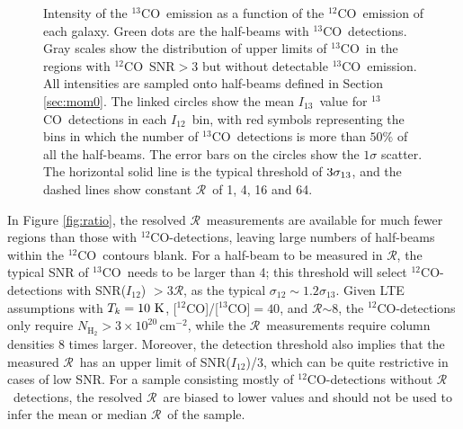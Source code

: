 \documentclass{emulateapj}
\def\ttco{\mbox{$^{13}$CO}}
\def\twco{\mbox{$^{12}$CO}}
\def\rtt{$\mathcal{R}$}
\def\un{\rm \ }
\def\itw{$I_{12}$}
\def\itt{$I_{13}$}
\begin{document}
 \begin{figure*}
\vspace{-1cm}
\caption{
Intensity of the \ttco \  emission as a function of the
  \twco \ emission of each galaxy. 
Green dots are the half-beams with \ttco \ detections.   
Gray scales show the distribution of upper limits of \ttco \  
in the regions with \twco \ SNR$ > 3$ but without detectable \ttco \  emission. 
All intensities are sampled onto half-beams defined in Section \ref{sec:mom0}. 
The linked circles show the mean \itt\ value for \ttco \ detections in each \itw \ bin, 
with red symbols representing the bins in which the number of \ttco \ detections is more than 
$50\%$ of all the half-beams.
The error bars on the circles show the $1\sigma$ scatter.  
The horizontal solid line is the typical threshold of $3\sigma_{\rm 13}$, and the dashed lines show constant \rtt \ of 1, 4, 16 and 64.   
}
\label{fig:i13vs12}
\end{figure*}

In Figure \ref{fig:ratio}, the resolved \rtt \ measurements are 
available for much fewer regions than those with \twco-detections,
leaving large numbers of half-beams within the \twco \ contours blank. 
For a half-beam to be measured in \rtt, the typical SNR of \ttco \ needs to be larger than 4;
this threshold will select \twco-detections with SNR(\itw) $> 3$\rtt, 
as the typical $\sigma_{12} \sim 1.2 \sigma_{13}$.
Given LTE assumptions with $T_k = 10 \un K$, [\twco]/[\ttco]$=40$,
and \rtt$\sim 8$, the \twco-detections only require 
$N_{\mathrm{H_2}} >  3 \times 10^{20}\, \mathrm{cm}^{-2}$,
while the \rtt \ measurements require column densities 8 times larger.
Moreover, the detection threshold also implies that the measured \rtt \ has 
an upper limit of SNR(\itw)/3, which can be quite restrictive in cases of low SNR. 
For a sample consisting mostly of \twco-detections without \rtt \ detections,
the resolved \rtt \ are biased to lower values and 
should not be used to infer the mean or median \rtt \ of the sample.
\end{document}
